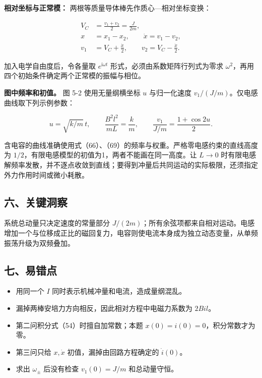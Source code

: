 \documentclass[12pt,a4paper,UTF8]{ctexart}
\newcommand{\tightlist}{\setlength{\itemsep}{0pt}\setlength{\parskip}{0pt}}
\begin{document}
\textbf{相对坐标与正常模：} 两根等质量导体棒先作质心---相对坐标变换：

\[\begin{aligned}
V_C&=\frac{v_1+v_2}{2}=\frac{J}{2m},\\
x&=x_1-x_2,\qquad \dot x=v_1-v_2,\\
v_1&=V_C+\frac{\dot x}{2},\qquad
v_2=V_C-\frac{\dot x}{2}.
\end{aligned}\]

加入电学自由度后，令各量取 \(e^{\mathrm i\omega t}\)
形式，必须由系数矩阵行列式为零求
\(\omega^2\)，再用四个初始条件确定两个正常模的振幅与相位。

\textbf{图中频率和初值。} 图 5-2 使用无量纲横坐标 \(u\) 与归一化速度
\(v_1/(J/m)\)。仅电感曲线取下列示例参数：

\[u=\sqrt{k/m}\,t,\qquad \frac{B^2l^2}{mL}=\frac km,\qquad \frac{v_1}{J/m}=\frac{1+\cos2u}{2}.\]

含电容的曲线准确使用式（66）、（69）的频率与权重。严格零电感约束的直线高度为
\(1/2\)，有限电感模型的初值为1，两者不能画在同一高度。让 \(L\to0\)
时有限电感解频率发散，并不逐点收敛到直线；要得到冲量后共同运动的实际极限，还须指定外力作用时间或微小耗散。

\subsection{六、关键洞察}\label{ux516dux5173ux952eux6d1eux5bdf-4}

系统总动量只决定速度的常量部分
\(J/(2m)\)；所有余弦项都来自相对运动。电感增加一个与位移成正比的磁回复力，电容则使电流本身成为独立动态变量，从单频振荡升级为双频叠加。

\subsection{七、易错点}\label{ux4e03ux6613ux9519ux70b9-4}

\begin{itemize}
\tightlist
\item
  用同一个 \(I\) 同时表示机械冲量和电流，造成量纲混乱。
\item
  漏掉两棒安培力方向相反，因此相对方程中电磁力系数为 \(2Bil\)。
\item
  第二问积分式（54）时擅自加常数；本题 \(x(0)=i(0)=0\)，积分常数才为零。
\item
  第三问只给 \(x,\dot x\) 初值，漏掉由回路方程确定的 \(\dot i(0)\)。
\item
  求出 \(\omega_\pm\) 后没有检查 \(v_1(0)=J/m\) 和总动量守恒。
\end{itemize}
\end{document}
